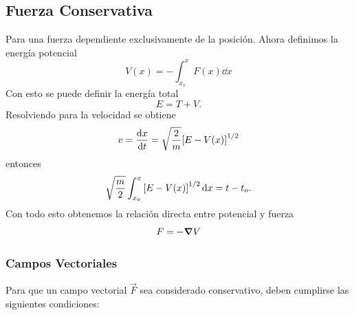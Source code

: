 \subsection{Fuerza Conservativa}

Para una fuerza dependiente exclusivamente de la posición. Ahora definimos la energía potencial
\begin{equation}
	V(x) = - \int _{x_s} ^x F(x) \dd{x}
\end{equation}
Con esto se puede definir la energía total
\begin{equation}
	E = T + V.
\end{equation}
Resolviendo para la velocidad se obtiene
\begin{equation}
	v = \dv{x}{t} = \sqrt{\frac{2}{m}} \qty[E - V(x)]^{1/2}
\end{equation}
entonces
\begin{equation}
	\sqrt{\frac{m}{2}} \int _{x_o} ^x \qty[E - V(x)]^{1/2} \dd{x} = t - t_o.
\end{equation}
Con todo esto obtenemos la relación directa entre potencial y fuerza
\begin{equation}
	F = -\grad{V}
\end{equation}

\subsubsection{Campos Vectoriales}
Para que un campo vectorial $\vec{F}$ sea considerado conservativo, deben cumplirse las siguientes condiciones:

